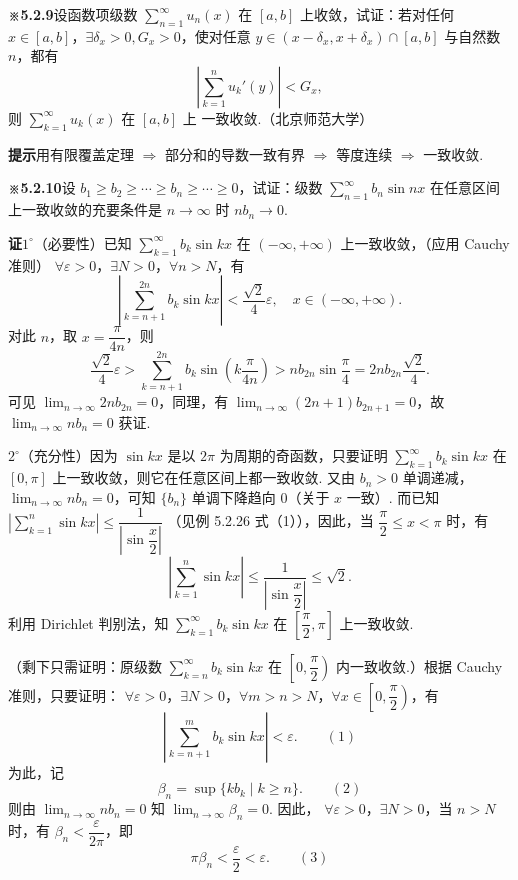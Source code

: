 \documentclass[UTF8, 12pt, fontset=fandol, oneside]{ctexart}
\begin{document}
\noindent\textbf{※5.2.9}\quad 设函数项级数 $\displaystyle\sum_{n=1}^{\infty}u_n(x)$ 在 $[a,b]$ 上收敛，试证：若对任何
$x\in[a,b]$，$\exists\delta_x>0,G_x>0$，使对任意 $y\in(x-\delta_x,x+\delta_x)\cap[a,b]$ 与自然数 $n$，都有
\[
  \left|\sum_{k=1}^n u_k'(y)\right|<G_x,
\]
则 $\displaystyle\sum_{k=1}^{\infty}u_k(x)$ 在 $[a,b]$ 上
一致收敛.（北京师范大学）

\noindent\textbf{提示}\quad 用有限覆盖定理 $\Rightarrow$ 部分和的导数一致有界 $\Rightarrow$ 等度连续 $\Rightarrow$ 一致收敛.

\noindent\textbf{※5.2.10}\quad 设 $b_1\ge b_2\ge\cdots\ge b_n\ge\cdots\ge0$，试证：级数
$\displaystyle\sum_{n=1}^{\infty}b_n\sin nx$ 在任意区间上一致收敛的充要条件是 $n\to\infty$ 时
$nb_n\to0$.

\noindent\textbf{证}\quad $1^\circ$（必要性）已知
$\displaystyle\sum_{k=1}^{\infty}b_k\sin kx$ 在 $(-\infty,+\infty)$ 上一致收敛，（应用 Cauchy 准则）
$\forall\varepsilon>0$，$\exists N>0$，$\forall n>N$，有
\[
  \left|\sum_{k=n+1}^{2n}b_k\sin kx\right|<\frac{\sqrt2}{4}\varepsilon,\quad
  x\in(-\infty,+\infty).
\]
对此 $n$，取 $x=\dfrac{\pi}{4n}$，则
\[
  \frac{\sqrt2}{4}\varepsilon
  >\sum_{k=n+1}^{2n}b_k\sin\left(k\frac{\pi}{4n}\right)
  >nb_{2n}\sin\frac\pi4=2nb_{2n}\frac{\sqrt2}{4}.
\]
可见 $\displaystyle\lim_{n\to\infty}2nb_{2n}=0$，同理，有
$\displaystyle\lim_{n\to\infty}(2n+1)b_{2n+1}=0$，故
$\displaystyle\lim_{n\to\infty}nb_n=0$ 获证.

$2^\circ$（充分性）因为 $\sin kx$ 是以 $2\pi$ 为周期的奇函数，只要证明
$\displaystyle\sum_{k=1}^{\infty}b_k\sin kx$ 在 $[0,\pi]$ 上一致收敛，则它在任意区间上都一致收敛. 又由
$b_n>0$ 单调递减，$\displaystyle\lim_{n\to\infty}nb_n=0$，可知 $\{b_n\}$ 单调下降趋向 0（关于
$x$ 一致）. 而已知
$\left|\displaystyle\sum_{k=1}^n\sin kx\right|\le\dfrac1{\left|\sin\dfrac x2\right|}$
（见例 5.2.26 式（1）），因此，当 $\dfrac\pi2\le x<\pi$ 时，有
\[
  \left|\sum_{k=1}^n\sin kx\right|
  \le\frac1{\left|\sin\dfrac x2\right|}\le\sqrt2.
\]
利用 Dirichlet 判别法，知
$\displaystyle\sum_{k=1}^{\infty}b_k\sin kx$ 在 $\left[\dfrac\pi2,\pi\right]$ 上一致收敛.

（剩下只需证明：原级数 $\displaystyle\sum_{k=n}^{\infty}b_k\sin kx$ 在
$\left[0,\dfrac\pi2\right)$ 内一致收敛.）根据 Cauchy 准则，只要证明：
$\forall\varepsilon>0$，$\exists N>0$，$\forall m>n>N$，$\forall x\in\left[0,\dfrac\pi2\right)$，有
\[
  \left|\sum_{k=n+1}^{m}b_k\sin kx\right|<\varepsilon.
\qquad(1)
\]
为此，记
\[
  \beta_n=\sup\{kb_k\mid k\ge n\}.
\qquad(2)
\]
则由 $\displaystyle\lim_{n\to\infty}nb_n=0$ 知 $\displaystyle\lim_{n\to\infty}\beta_n=0$. 因此，
$\forall\varepsilon>0$，$\exists N>0$，当 $n>N$ 时，有
$\beta_n<\dfrac{\varepsilon}{2\pi}$，即
\[
  \pi\beta_n<\frac\varepsilon2<\varepsilon.
\qquad(3)
\]
\end{document}
